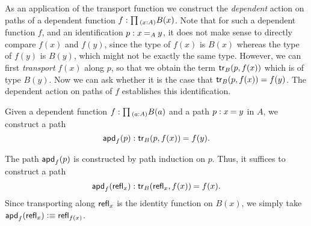 As an application of the transport function we construct the \emph{dependent} action on paths of a dependent function $f:\prd{x:A}B(x)$. Note that for such a dependent function $f$, and an identification $p:\id[A]{x}{y}$, it does not make sense to directly compare $f(x)$ and $f(y)$, since the type of $f(x)$ is $B(x)$ whereas the type of $f(y)$ is $B(y)$, which might not be exactly the same type. However, we can first \emph{transport} $f(x)$ along $p$, so that we obtain the term $\mathsf{tr}_B(p,f(x))$ which is of type $B(y)$. Now we can ask whether it is the case that $\mathsf{tr}_B(p,f(x))=f(y)$. The dependent action on paths of $f$ establishes this identification.

\begin{defn}\label{defn:apd}
Given a dependent function $f:\prd{a:A}B(a)$ and a path $p:\id{x}{y}$ in $A$, we construct a path
\begin{equation*}
\apd{f}{p} : \id{\tr_B(p,f(x))}{f(y)}.
\end{equation*}
\end{defn}

\begin{constr}
The path $\mathsf{apd}_{f}\mathopen{}\left(p\right)\mathclose{}$ is constructed by path induction on $p$. Thus, it suffices to construct a path
\begin{equation*}
\apd{f}{\refl{x}}:\id{\tr_B(\refl{x},f(x))}{f(x)}.
\end{equation*}
Since transporting along $\mathsf{refl}_{x}$ is the identity function on $B(x)$, we simply take $\mathsf{apd}_{f}\mathopen{}\left(\mathsf{refl}_{x}\right)\mathclose{}\vcentcolon\equiv\mathsf{refl}_{f(x)}$. 
\end{constr}

